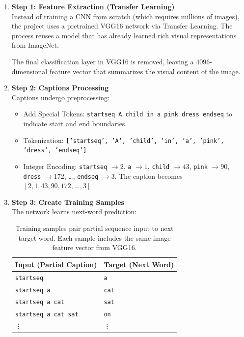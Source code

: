 \begin{enumerate}
    \item \textbf{Step 1: Feature Extraction (Transfer Learning)} \\
    Instead of training a CNN from scratch (which requires millions of images), the project uses a pretrained VGG16 network via Transfer Learning. The process reuses a model that has already learned rich visual representations from ImageNet.
    
    The final classification layer in VGG16 is removed, leaving a $4096$-dimensional feature vector that summarizes the visual content of the image.

    \item \textbf{Step 2: Captions Processing} \\
    Captions undergo preprocessing:
    \begin{itemize}
        \item Add Special Tokens: \texttt{startseq A child in a pink dress endseq} to indicate start and end boundaries.
        \item Tokenization: \texttt{['startseq', 'A', 'child', 'in', 'a', 'pink', 'dress', 'endseq']}
        \item Integer Encoding: \texttt{startseq} $\to 2$, \texttt{a} $\to 1$, \texttt{child} $\to 43$, \texttt{pink} $\to 90$, \texttt{dress} $\to 172$, \dots, \texttt{endseq} $\to 3$. The caption becomes $[2, 1, 43, 90, 172, \dots, 3]$.
    \end{itemize}

    \item \textbf{Step 3: Create Training Samples} \\
    The network learns next-word prediction:
    \begin{table}[htbp]
    \centering
    \begin{tabular}{l | l}
    \hline
    \textbf{Input (Partial Caption)} & \textbf{Target (Next Word)} \\
    \hline
    \texttt{startseq} & \texttt{a} \\
    \texttt{startseq a} & \texttt{cat} \\
    \texttt{startseq a cat} & \texttt{sat} \\
    \texttt{startseq a cat sat} & \texttt{on} \\
    \vdots & \vdots \\
    \hline
    \end{tabular}
    \caption{Training samples pair partial sequence input to next target word. Each sample includes the same image feature vector from VGG16.}
    \end{table}


\end{enumerate}
